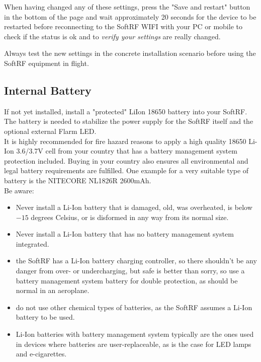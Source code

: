 \documentclass[10pt,a4paper]{article}
\begin{document}
When having changed any of these settings, press the "Save and restart" button in the bottom of the page and wait approximately 20 seconds for the device to be restarted before reconnecting to the SoftRF WIFI with your PC or mobile to check if the status is ok and to {\em verify your settings} are really changed.

Always test the new settings in the concrete installation scenario before using the SoftRF equipment in flight.

\subsection{Internal Battery}\label{battery}
If not yet installed, install a "protected" LiIon 18650 battery into your SoftRF. The battery is needed to stabilize the power supply for the SoftRF itself and the optional external Flarm LED.\\

It is highly recommended for fire hazard reasons to apply a high quality 18650 Li-Ion 3.6/3.7V cell from your country that has a battery management system protection included. Buying in your country also ensures all environmental and legal battery requirements are fulfilled. One example for a very suitable type of battery is the NITECORE NL1826R 2600mAh.\\

Be aware:

\begin{itemize}
\item Never install a Li-Ion battery that is damaged, old, was overheated, is below $-15$ degrees Celsius, or is disformed in any way from its normal size.
\item Never install a Li-Ion battery that has no battery management system integrated.
\item the SoftRF has a Li-Ion battery charging controller, so there shouldn't be any danger from over- or undercharging, but safe is better than sorry, so use a battery management system battery for double protection, as should be normal in an aeroplane.
\item do not use other chemical types of batteries, as the SoftRF assumes a Li-Ion battery to be used.
\item Li-Ion batteries with battery management system typically are the ones used in devices where batteries are user-replaceable, as is the case for LED lamps and e-cigarettes.
\end{itemize}
\end{document}
